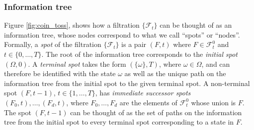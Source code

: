 \documentclass[\topdir/lecture\_notes.tex]{subfiles}
\begin{document}
\subsubsection*{Information tree}
Figure \ref{fig:coin_toss}, shows how a filtration \(\{\mathcal{F}_{t}\}\) can be thought of as an information tree, whose nodes correspond to what we call ``spots'' or ``nodes''. Formally, a \emph{spot} of the filtration \(\{\mathcal{F}_{t}\}\) is a pair \((F, t)\) where \(F \in \mathcal{F}_{t}^{0}\) and \(t \in\{0, \ldots, T\}\). The root of the information tree corresponds to the \emph{initial spot} \((\Omega, 0)\). A \emph{terminal spot} takes the form \((\{\omega\}, T)\), where \(\omega \in \Omega\), and can therefore be identified with the state \(\omega\) as well as the unique path on the information tree from the initial spot to the given terminal spot. A non-terminal spot \((F, t-1)\), \(t \in\{1, \ldots, T\}\), has \emph{immediate successor spots} \((F_{0}, t), \ldots,(F_{d}, t)\), where \(F_{0}, \ldots, F_{d}\) are the elements of \(\mathcal{F}_{t}^{0}\) whose union is \(F\). The spot \((F, t-1)\) can be thought of as the set of paths on the information tree from the initial spot to every terminal spot corresponding to a state in \(F\).
\end{document}
